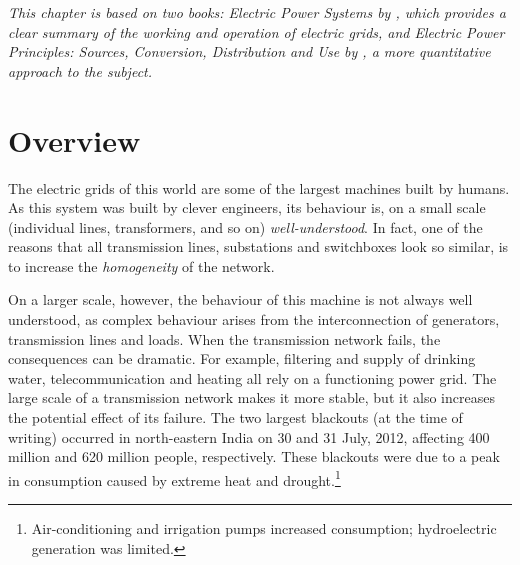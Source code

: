 \documentclass[main.tex]{subfiles}
\begin{document}



%
%
%
%
%
%

\emph{This chapter is based on two books: \emph{Electric Power Systems} by \cite{VonMeier2006}, which provides a clear summary of the working and operation of electric grids, and \emph{Electric Power Principles: Sources, Conversion, Distribution and Use} by \cite{Kirtley2010}, a more quantitative approach to the subject.}
\section{Overview}
The electric grids of this world are some of the largest machines built by humans. As this system was built by clever engineers, its behaviour is, on a small scale (individual lines, transformers, and so on) \emph{well-understood}. In fact, one of the reasons that all transmission lines, substations and switchboxes look so similar, is to increase the \emph{homogeneity} of the network.

On a larger scale, however, the behaviour of this machine is not always well understood, as complex behaviour arises from the interconnection of generators, transmission lines and loads.
When the transmission network fails, the consequences can be dramatic. For example, filtering and supply of drinking water, telecommunication and heating all rely on a functioning power grid. The large scale of a transmission network makes it more stable, but it also increases the potential effect of its failure. The two largest blackouts (at the time of writing) occurred in north-eastern India on 30 and 31 July, 2012, affecting 400 million and 620 million people, respectively. These blackouts were due to a peak in consumption caused by extreme heat and drought.\footnote{Air-conditioning and irrigation pumps increased consumption; hydroelectric generation was limited.}
\end{document}
